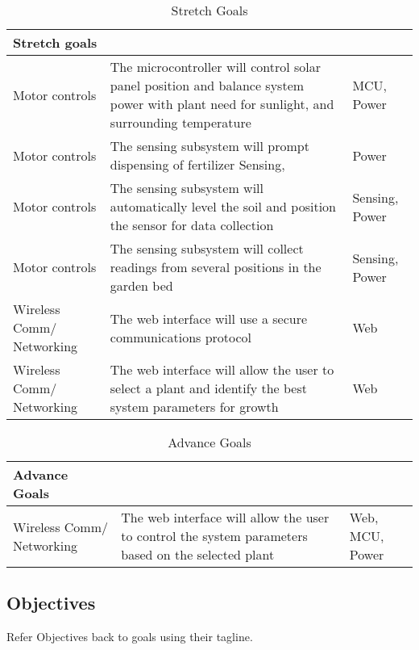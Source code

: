 \begin{table}[H]
  \centering
  \begin{tabular}{|p{3cm}|p{7cm}|p{3cm}|}
    \hline
    Stretch goals &  & \\
    \hline
    Motor controls & The microcontroller will control solar panel position and balance system power with plant need for sunlight, and surrounding temperature & MCU, Power\\
    \hline
    Motor controls & The sensing subsystem will prompt dispensing of fertilizer	Sensing, & Power\\
    \hline
    Motor controls & The sensing subsystem will automatically level the soil and position the sensor for data collection & Sensing, Power\\
    \hline
    Motor controls & The sensing subsystem will collect readings from several positions in the garden bed & Sensing, Power\\
    \hline
    Wireless Comm/ Networking & The web interface will use a secure communications protocol & Web\\
    \hline
    Wireless Comm/ Networking & The web interface will allow the user to select a plant and identify the best system parameters for growth & Web\\
    \hline
  \end{tabular}
  \label{table:StretchGoals}
  \caption{Stretch Goals}
\end{table}

\begin{table}[H]
  \centering
  \begin{tabular}{|p{3cm}|p{7cm}|p{3cm}|}
    \hline
    Advance Goals &  & \\
    \hline
    Wireless Comm/ Networking & The web interface will allow the user to control the system parameters based on the selected plant & Web, MCU, Power\\
    \hline
  \end{tabular}
  \label{table:AdvanceGoals}
  \caption{Advance Goals}
\end{table}

\subsection{Objectives}

Refer Objectives back to goals using their tagline.


